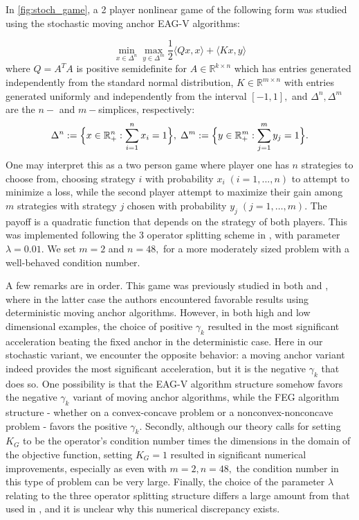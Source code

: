 \documentclass[11pt,reqno,oneside]{amsart}
\theoremstyle{definition}
\numberwithin{equation}{section}
\begin{document}
In \cref{fig:stoch_game}, a 2 player nonlinear game of the following form was studied using the stochastic moving anchor EAG-V algorithms:

\[\min_{x \in \Delta^{n}} \max_{y \in \Delta^{m}} \frac{1}{2}\langle Qx,x\rangle + \langle Kx,y \rangle \]
where $Q = A^{T}A$ is positive semidefinite for $A \in \mathbb{R}^{k \times n}$ which has entries generated independently from the standard normal distribution, $K \in \mathbb{R}^{m \times n}$ with entries generated uniformly and independently from the interval $[-1,1],$ and $\Delta^{n}, \Delta^{m}$ are the $n-$ and $m-$simplices, respectively:
\[\Delta^{n} := \Big{\{} x\in\mathbb{R}_{+}^{n}: \sum_{i=1}^{n}x_{i} = 1 \Big{\}}, \; \Delta^{m} := \Big{\{} y\in\mathbb{R}_{+}^{m}: \sum_{j=1}^{m}y_{j} = 1 \Big{\}}.\]
One may interpret this as a two person game where player one has $n$ strategies to choose from, choosing strategy $i$ with probability $x_{i} \; (i = 1, . . . , n)$ to attempt to minimize a loss, while the second player attempt to maximize their gain among $m$ strategies with strategy $j$ chosen with probability $y_{j} \; (j = 1, \ldots , m).$
The payoff is a quadratic function that depends on the strategy of both players.
This was implemented following the 3 operator splitting scheme in \cite{davis2017three}, with parameter $\lambda = 0.01$.
We set $m = 2$ and $n=48,$ for a more moderately sized problem with a well-behaved condition number.

A few remarks are in order.
This game was previously studied in both \cite{chen2014optimal} and \cite{alcala2023moving}, where in the latter case the authors encountered favorable results using deterministic moving anchor algorithms.
However, in both high and low dimensional examples, the choice of positive $\gamma_{k}$ resulted in the most significant acceleration beating the fixed anchor in the deterministic case.
Here in our stochastic variant, we encounter the opposite behavior: a moving anchor variant indeed provides the most significant acceleration, but it is the negative $\gamma_{k}$ that does so.
One possibility is that the EAG-V algorithm structure somehow favors the negative $\gamma_{k}$ variant of moving anchor algorithms, while the FEG algorithm structure - whether on a convex-concave problem or a nonconvex-nonconcave problem - favors the positive $\gamma_{k}$.
Secondly, although our theory calls for setting $K_{G}$ to be the operator's condition number times the dimensions in the domain of the objective function, setting $K_{G} = 1$ resulted in significant numerical improvements, especially as even with $m = 2, n = 48,$ the condition number in this type of problem can be very large.
Finally, the choice of the parameter $\lambda$ relating to the three operator splitting structure differs a large amount from that used in \cite{alcala2023moving}, and it is unclear why this numerical discrepancy exists.
\end{document}
